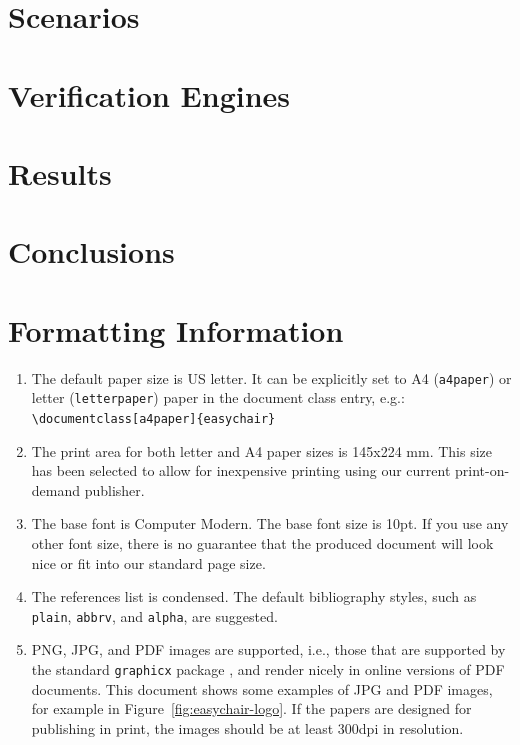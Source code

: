 \documentclass{easychair}
\begin{document}
\section{Scenarios}
\label{sect:scenarios}

\section{Verification Engines}

\section{Results}

\section{Conclusions}




\label{sect:bib}

%
%
%


\appendix
\section{Formatting Information}
\label{sect:easychair-requirements}
\begin{enumerate}
	\item
	The default paper size is US letter. It can be explicitly set to A4 
	(\texttt{a4paper}) or letter (\texttt{letterpaper}) paper in the
	document class entry, e.g.:\\\verb+\documentclass[a4paper]{easychair}+
	
	\item
	The print area for both letter and A4 paper sizes is 145x224 mm. This size
	has been selected to allow for inexpensive printing using our current
	print-on-demand publisher.
	
	\item
	The base font is Computer Modern. The base font size is 10pt. If you
	use any other font size, there is no guarantee that the produced
	document will look nice or fit into our standard page size.
	
	\item
	The references list is condensed. The default bibliography styles, such as
	\texttt{plain}, \texttt{abbrv}, and \texttt{alpha}, are suggested.
	
	\item
	PNG, JPG, and PDF images are supported, i.e., those that are supported
	by the standard \texttt{graphicx} package \cite{graphicx-package}, and
	render nicely in online versions of PDF documents.  This document
	shows some examples of JPG and PDF images, for example in
	Figure~\ref{fig:easychair-logo}. If the papers are designed for
	publishing in print, the images should be at least 300dpi in
	resolution. 
	
\end{enumerate}
\end{document}
